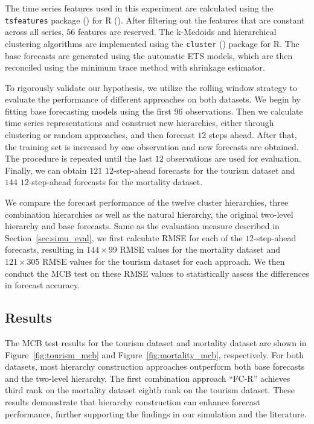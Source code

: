 \documentclass[a4paper,review,12pt,authoryear]{elsarticle}
\begin{document}
The time series features used in this experiment are calculated using the \texttt{tsfeatures} package (\citealp{tsfeatures}) for R (\citealp{R}). After filtering out the features that are constant across all series, $56$ features are reserved. The k-Medoids and hierarchical clustering algorithms are implemented using the \texttt{cluster} (\citealp{cluster}) package for R. The base forecasts are generated using the automatic ETS models, which are then reconciled using the minimum trace method with shrinkage estimator.

To rigorously validate our hypothesis, we utilize the rolling window strategy to evaluate the performance of different approaches on both datasets. We begin by fitting base forecasting models using the first $96$ observations. Then we calculate time series representations and construct new hierarchies, either through clustering or random approaches, and then forecast $12$ steps ahead. After that, the training set is increased by one observation and new forecasts are obtained. The procedure is repeated until the last $12$ observations are used for evaluation. Finally, we can obtain $121$ $12$-step-ahead forecasts for the tourism dataset and $144$ $12$-step-ahead forecasts for the mortality dataset. 

We compare the forecast performance of the twelve cluster hierarchies, three combination hierarchies as well as the natural hierarchy, the original two-level hierarchy and base forecasts. Same as the evaluation measure described in Section~\ref{sec:simu_eval}, we first calculate RMSE for each of the $12$-step-ahead forecasts, resulting in $144 \times 99$ RMSE values for the mortality dataset and $121 \times 305$ RMSE values for the tourism dataset for each approach. We then conduct the MCB test on these RMSE values to statistically assess the differences in forecast accuracy.

\subsection{Results}

The MCB test results for the tourism dataset and mortality dataset are shown in Figure~\ref{fig:tourism_mcb} and Figure~\ref{fig:mortality_mcb}, respectively. For both datasets, most hierarchy construction approaches outperform both base forecasts and the two-level hierarchy. The first combination approach ``FC-R'' achieves third rank on the mortality dataset eighth rank on the tourism dataset. These results demonstrate that hierarchy construction can enhance forecast performance, further supporting the findings in our simulation and the literature. 
\end{document}
